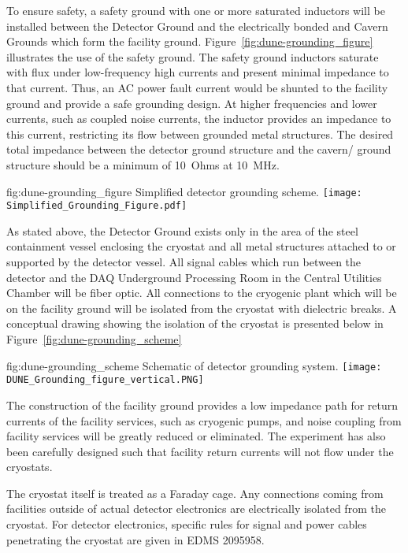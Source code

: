 To ensure safety, a safety ground with one or more saturated inductors
will be installed between the Detector Ground and the electrically
bonded  and Cavern Grounds which form the facility ground.
Figure~\ref{fig:dune-grounding_figure} illustrates the use of the
safety ground. The safety ground inductors saturate with flux under
low-frequency high currents and present minimal impedance to that
current.  Thus, an AC power fault current would be shunted to the
facility ground and provide a safe grounding design. At higher
frequencies and lower currents, such as coupled noise currents, the
inductor provides an impedance to this current, restricting its flow
between grounded metal structures. The desired total impedance between
the detector ground structure and the cavern/ ground
structure should be a minimum of \SI{10}{Ohms} at \SI{10}{MHz}.

\begin{dunefigure}{fig:dune-grounding_figure}
  {Simplified detector grounding scheme.}
  \texttt{[image: Simplified\_Grounding\_Figure.pdf]}
\end{dunefigure}

As stated above, the Detector Ground exists only in the area of the steel containment vessel enclosing the cryostat and all metal structures attached to or supported by the detector vessel.  All signal cables which run between the detector and the DAQ Underground Processing Room in the Central Utilities Chamber will be fiber optic.  All connections to the cryogenic plant which will be on the facility ground will be isolated from the cryostat with dielectric breaks.  A conceptual drawing showing the isolation of the cryostat is presented below in Figure~\ref{fig:dune-grounding_scheme}

\begin{dunefigure}{fig:dune-grounding_scheme}
  {Schematic of detector grounding system.}
  \texttt{[image: DUNE\_Grounding\_figure\_vertical.PNG]}
\end{dunefigure}
The construction of the facility ground provides a low impedance path for return currents of the facility services, such as cryogenic pumps, and noise coupling from facility services will be greatly reduced or eliminated.  The experiment has also been carefully designed such that facility return currents will not flow under the cryostats.

The cryostat itself is treated as a Faraday cage.  Any connections coming from facilities outside of actual detector electronics are electrically isolated from the cryostat.  For detector electronics, specific rules for signal and power cables penetrating the cryostat are given in EDMS 2095958.  





